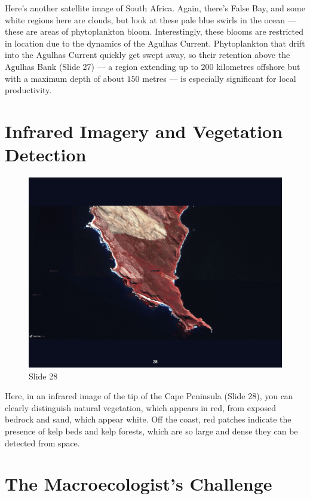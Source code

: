 \documentclass[
  10pt,
]{book}
\begin{document}
Here's another satellite image of South Africa. Again, there's False
Bay, and some white regions here are clouds, but look at these pale blue
swirls in the ocean --- these are areas of phytoplankton bloom.
Interestingly, these blooms are restricted in location due to the
dynamics of the Agulhas Current. Phytoplankton that drift into the
Agulhas Current quickly get swept away, so their retention above the
Agulhas Bank (Slide 27) --- a region extending up to \(200\) kilometres
offshore but with a maximum depth of about \(150\) metres --- is
especially significant for local productivity.

\section{Infrared Imagery and Vegetation
Detection}\label{infrared-imagery-and-vegetation-detection}

\begin{figure}[ht]
\centering
\includegraphics[width=0.8\linewidth]{../images/BDC334/BDC334-028.jpeg}
\caption*{Slide 28}
\end{figure}

Here, in an infrared image of the tip of the Cape Peninsula (Slide 28),
you can clearly distinguish natural vegetation, which appears in red,
from exposed bedrock and sand, which appear white. Off the coast, red
patches indicate the presence of kelp beds and kelp forests, which are
so large and dense they can be detected from space.

\section{The Macroecologist's
Challenge}\label{the-macroecologists-challenge}
\end{document}
